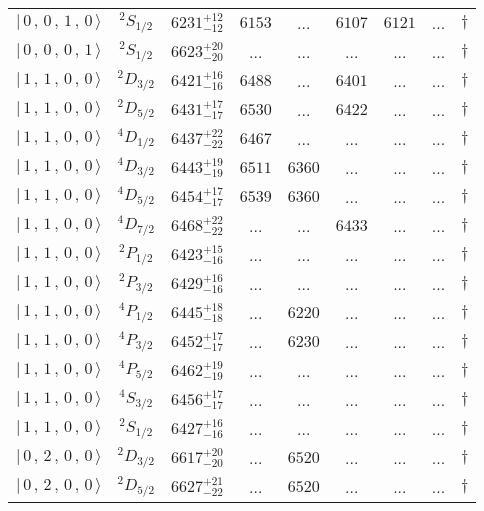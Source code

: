 \begin{tabular}{c c| c c c c c c c}
$\vert \,0\,,\,0\,,\,1\,,\,0 \,\rangle $ & $^{2}S_{1/2}$ & $6231^{+12}_{-12}$ & $6153$ & ... & $6107$ & $6121$ & ... & $\dagger$ \\ 
$\vert \,0\,,\,0\,,\,0\,,\,1 \,\rangle $ & $^{2}S_{1/2}$ & $6623^{+20}_{-20}$ & ... & ... & ... & ... & ... & $\dagger$ \\ 
$\vert \,1\,,\,1\,,\,0\,,\,0 \,\rangle $ & $^{2}D_{3/2}$ & $6421^{+16}_{-16}$ & $6488$ & ... & $6401$ & ... & ... & $\dagger$ \\ 
$\vert \,1\,,\,1\,,\,0\,,\,0 \,\rangle $ & $^{2}D_{5/2}$ & $6431^{+17}_{-17}$ & $6530$ & ... & $6422$ & ... & ... & $\dagger$ \\ 
$\vert \,1\,,\,1\,,\,0\,,\,0 \,\rangle $ & $^{4}D_{1/2}$ & $6437^{+22}_{-22}$ & $6467$ & ... & ... & ... & ... & $\dagger$ \\ 
$\vert \,1\,,\,1\,,\,0\,,\,0 \,\rangle $ & $^{4}D_{3/2}$ & $6443^{+19}_{-19}$ & $6511$ & $6360$ & ... & ... & ... & $\dagger$ \\ 
$\vert \,1\,,\,1\,,\,0\,,\,0 \,\rangle $ & $^{4}D_{5/2}$ & $6454^{+17}_{-17}$ & $6539$ & $6360$ & ... & ... & ... & $\dagger$ \\ 
$\vert \,1\,,\,1\,,\,0\,,\,0 \,\rangle $ & $^{4}D_{7/2}$ & $6468^{+22}_{-22}$ & ... & ... & $6433$ & ... & ... & $\dagger$ \\ 
$\vert \,1\,,\,1\,,\,0\,,\,0 \,\rangle $ & $^{2}P_{1/2}$ & $6423^{+15}_{-16}$ & ... & ... & ... & ... & ... & $\dagger$ \\ 
$\vert \,1\,,\,1\,,\,0\,,\,0 \,\rangle $ & $^{2}P_{3/2}$ & $6429^{+16}_{-16}$ & ... & ... & ... & ... & ... & $\dagger$ \\ 
$\vert \,1\,,\,1\,,\,0\,,\,0 \,\rangle $ & $^{4}P_{1/2}$ & $6445^{+18}_{-18}$ & ... & $6220$ & ... & ... & ... & $\dagger$ \\ 
$\vert \,1\,,\,1\,,\,0\,,\,0 \,\rangle $ & $^{4}P_{3/2}$ & $6452^{+17}_{-17}$ & ... & $6230$ & ... & ... & ... & $\dagger$ \\ 
$\vert \,1\,,\,1\,,\,0\,,\,0 \,\rangle $ & $^{4}P_{5/2}$ & $6462^{+19}_{-19}$ & ... & ... & ... & ... & ... & $\dagger$ \\ 
$\vert \,1\,,\,1\,,\,0\,,\,0 \,\rangle $ & $^{4}S_{3/2}$ & $6456^{+17}_{-17}$ & ... & ... & ... & ... & ... & $\dagger$ \\ 
$\vert \,1\,,\,1\,,\,0\,,\,0 \,\rangle $ & $^{2}S_{1/2}$ & $6427^{+16}_{-16}$ & ... & ... & ... & ... & ... & $\dagger$ \\ 
$\vert \,0\,,\,2\,,\,0\,,\,0 \,\rangle $ & $^{2}D_{3/2}$ & $6617^{+20}_{-20}$ & ... & $6520$ & ... & ... & ... & $\dagger$ \\ 
$\vert \,0\,,\,2\,,\,0\,,\,0 \,\rangle $ & $^{2}D_{5/2}$ & $6627^{+21}_{-22}$ & ... & $6520$ & ... & ... & ... & $\dagger$ \\ 
\hline \hline
\end{tabular}
